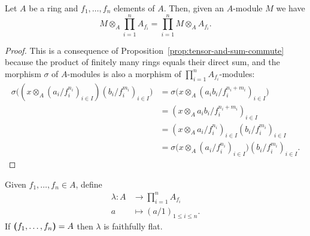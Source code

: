 \begin{lem}\label{lem:localization-product}
    Let\/ $A$ be a ring and\/ $f_1,\dots,f_n$ elements of\/ $A$. Then, given an\/ $A$-module\/ $M$ we have
    $$
        M\otimes_A\prod_{i=1}^nA_{f_i}
            = \prod_{i=1}^nM\otimes_AA_{f_i}.
    $$
\end{lem}

\begin{proof}
    This is a consequence of Proposition~\ref{prop:tensor-and-sum-commute} because the product of finitely many rings equals their direct sum, and the morphism $\sigma$ of $A$-modules is also a morphism of $\prod_{i=1}^nA_{f_i}$-modules:
    \begin{align*}
        \sigma\big((x\otimes_A(a_i/f_i^{n_i})_{i\in I})(b_i/f_i^{m_i})_{i\in I}\big)
            &= \sigma\big(
                x\otimes_A(a_ib_i/f_i^{n_i+m_i})_{i\in I}
                \big)\\
            &= (x\otimes_A a_ib_i/f_i^{n_i+m_i})_{i\in I}\\
            &= (x\otimes_A a_i/f_i^{n_i})_{i\in I}
                (b_i/f_i^{m_i})_{i\in I}\\
            &= \sigma\big(x\otimes_A(a_i/f_i^{n_i})_{i\in I}\big)
                (b_i/f_i^{m_i})_{i\in I}.
    \end{align*}
\end{proof}

\begin{prop}\label{prop:ff-prod}
    Given\/ $f_1,\dots,f_n\in A$, define
    \begin{align*}
        \lambda\colon A&\to\prod_{i=1}^nA_{f_i}\\
        a&\mapsto(a/1)_{1\le i\le n}.
    \end{align*}
    If\/ $\textrm{\boldmath$($}f_1,\dots, f_n\textrm{\boldmath$)$}=A$ then\/ $\lambda$ is faithfully flat.
\end{prop}

